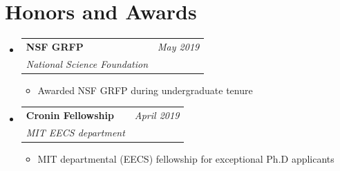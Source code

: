 \documentclass[letter,11pt]{article}
\makeatletter
\let\HREF\href
\renewcommand{\href}[2]{\HREF{#1}{\begingroup\UrlFont #2\endgroup}}
\newcommand{\resumeProject}[4]{
\vspace{0.5mm}\item
    \begin{tabular*}{0.98\textwidth}[t]{l@{\extracolsep{\fill}}r}
        \textbf{#1} & \textit{\footnotesize{#3}} \\
        \footnotesize{\textit{#2}} & \footnotesize{#4}
    \end{tabular*}
    \vspace{-2.4mm}
}
\newcommand{\resumeSubHeadingListStart}{\begin{itemize}[leftmargin=*,labelsep=1mm]}
\newcommand{\resumeItemListStart}{\begin{itemize}[leftmargin=*,labelsep=1mm,itemsep=0.5mm]}
\newcommand{\resumeSubHeadingListEnd}{\end{itemize}\vspace{2mm}}
\newcommand{\resumeItemListEnd}{\end{itemize}\vspace{-2mm}}
\makeatother
\begin{document}
\section{\textbf{Honors and Awards}}
\vspace{-0.4mm}
\resumeSubHeadingListStart

\resumeProject
{NSF GRFP}
{National Science Foundation}
{May 2019}
{{}}%
\resumeItemListStart
\item Awarded NSF GRFP during undergraduate tenure
\resumeItemListEnd

\resumeProject
{Cronin Fellowship}
{MIT EECS department}
{April 2019}
{{}}
\resumeItemListStart
\item MIT departmental (EECS) fellowship for exceptional Ph.D applicants
\resumeItemListEnd

\resumeSubHeadingListEnd

\vspace{-6mm}



\end{document}
